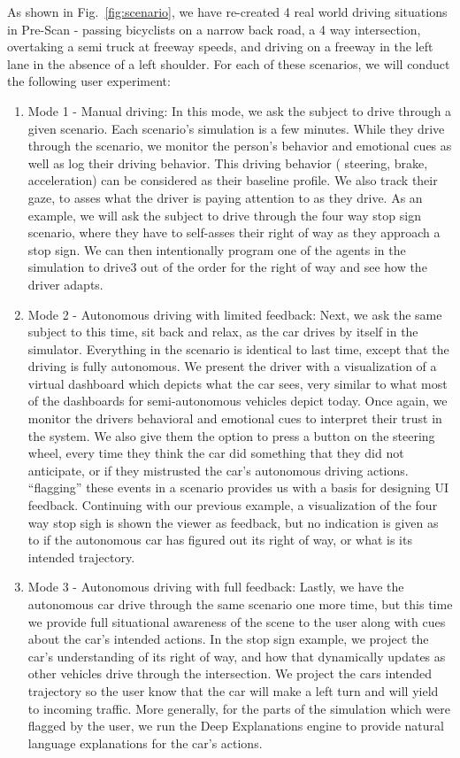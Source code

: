 As shown in Fig.~\ref{fig:scenario}, we have re-created 4 real world driving situations in Pre-Scan - passing bicyclists on a narrow back road, a 4 way intersection, overtaking a semi truck at freeway speeds, and driving on a  freeway in the left lane in the absence of a left shoulder. 
For each of these scenarios, we will conduct the following user experiment:
\begin{enumerate}
    \item Mode 1 - Manual driving: In this mode, we ask the subject to drive through a given scenario. Each scenario's simulation is a few minutes. While they drive through the scenario, we monitor the person's behavior and emotional cues as well as log their driving behavior. This driving behavior ( steering, brake, acceleration) can be considered as their baseline profile. We also track their gaze, to asses what the driver is paying attention to as they drive. As an example, we will ask the subject to drive through the four way stop sign scenario, where they have to self-asses their right of way as they approach a stop sign. We can then intentionally program one of the agents in the simulation to drive3 out of the order for the right of way and see how the driver adapts. 
    \item Mode 2 - Autonomous driving with limited feedback: Next, we ask the same subject to this time, sit back and relax, as the car drives by itself in the simulator. Everything in the scenario is identical to last time, except that the driving is fully autonomous. We present the driver with a visualization of a virtual dashboard which depicts what the car sees, very similar to what most of the dashboards for semi-autonomous vehicles depict today.  Once again, we monitor the drivers behavioral and emotional cues to interpret their trust in the system. We also give them the option to press a button on the steering wheel, every time they think the car did something that they did not anticipate, or if they mistrusted the car's autonomous driving actions. ``flagging'' these events in a scenario provides us with a basis for designing UI feedback. Continuing with our previous example, a visualization of the four way stop sigh is shown the viewer as feedback, but no indication is given as to if the autonomous car has figured out its right of way, or what is its intended trajectory.
    \item Mode 3 - Autonomous driving with full feedback: Lastly, we have the autonomous car drive through the same scenario one more time, but this time we provide full situational awareness of the scene to the user along with cues about the car's intended actions. In the stop sign example, we project the car's understanding of its right of way, and how that dynamically updates as other vehicles drive through the intersection. We project the cars intended trajectory so the user know that the car will make a left turn and will yield to incoming traffic. More generally, for the parts of the simulation which were flagged by the user, we run the Deep Explanations engine to provide natural language explanations for the car's actions. 
    
\end{enumerate}

